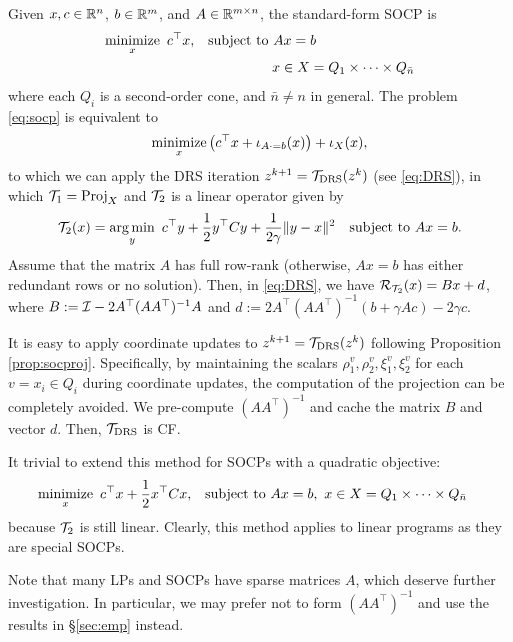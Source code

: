 {{{Given $x,c\in\mathbb{R}^n$, $b\in\mathbb{R}^m$, and $A\in\mathbb{R}^{m\times n}$, the standard-form SOCP is
\begin{subequations}\label{eq:socp}
\begin{align}
\Min_x~c^\top x,&\quad\St~ Ax=b\\
&\hspace{56pt} x\in X=Q_1\times \cdots\times Q_{\bar{n}}
\end{align}
\end{subequations}
where each $Q_i$ is a second-order cone, and $\bar{n}\not=n$ in general.
The problem \eqref{eq:socp} is equivalent to 
$$\operatorname*{minimize}_x \big(c^\top  x+\iota_{A\cdot =b}(x)\big)+\iota_X(x),$$
to which we can apply the DRS iteration $z^{k+1} = {{\mathcal{T}}_{\mathrm{DRS}}} (z^k)$ (see \eqref{eq:DRS}), in which ${\mathcal{T}}_1 = {\mathrm{Proj}}_X$ and ${\mathcal{T}}_2$ is a linear operator given by 
$${\mathcal{T}}_2(x) = \operatorname*{arg\,min}_y ~ c^\top y+\frac{1}{2}y^\top Cy +  \frac{1}{2\gamma}\|y-x\|^2\quad {\mathrm{subject~to}}~ Ax=b.$$
Assume that the matrix $A$ has full row-rank (otherwise, $Ax=b$ has either redundant rows or no solution). 
Then, in \eqref{eq:DRS}, we have ${\mathcal{R}}_{{\mathcal{T}}_2}(x)= Bx+d$, where $B:={\mathcal{I}}-2A^\top (AA^\top )^{-1}A$ and $d:=2A^\top (AA^\top )^{-1}(b+\gamma Ac)-2\gamma c$.

It is easy to apply coordinate updates to $z^{k+1} = {{\mathcal{T}}_{\mathrm{DRS}}} (z^k)$ following Proposition \ref{prop:socproj}. Specifically, by maintaining the scalars $\rho_1^v,\rho_2^v,\xi_1^v,\xi_2^v$ for each $v=x_i\in Q_i$ during  coordinate updates, the computation of the projection can be completely avoided. We pre-compute $(AA^\top )^{-1}$ and cache the matrix $B$ and vector $d$. Then, ${{\mathcal{T}}_{\mathrm{DRS}}}$ is CF. 

It trivial to extend this method for  SOCPs with a quadratic objective:
\begin{align*}
\Min_x~c^\top x+\frac{1}{2}x^\top Cx,&\quad\St~ Ax=b,~ x\in X=Q_1\times \cdots\times Q_{\bar{n}}
\end{align*}
because ${\mathcal{T}}_2$ is still linear.  Clearly, this method applies to linear programs as they are special SOCPs.

Note that many LPs and SOCPs have sparse matrices $A$, which deserve further investigation. In particular, we may prefer not to form $(AA^\top )^{-1}$ and use the results in \S\ref{sec:emp} instead.

}}}
